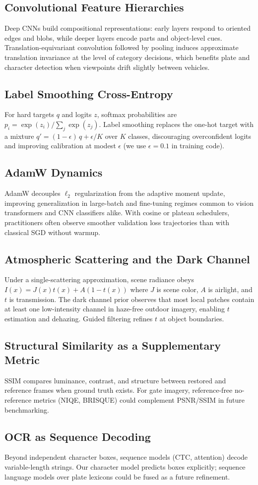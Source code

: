 \subsection{Convolutional Feature Hierarchies}
Deep CNNs build compositional representations: early layers respond to oriented edges and blobs, while deeper layers encode parts and object-level cues. Translation-equivariant convolution followed by pooling induces approximate translation invariance at the level of category decisions, which benefits plate and character detection when viewpoints drift slightly between vehicles.

\subsection{Label Smoothing Cross-Entropy}
For hard targets $q$ and logits $z$, softmax probabilities are $p_i=\exp(z_i)/\sum_j\exp(z_j)$. Label smoothing replaces the one-hot target with a mixture $q'=(1-\epsilon)\,q+\epsilon/K$ over $K$ classes, discouraging overconfident logits and improving calibration at modest $\epsilon$ (we use $\epsilon{=}0.1$ in training code).

\subsection{AdamW Dynamics}
AdamW decouples $\ell_2$ regularization from the adaptive moment update, improving generalization in large-batch and fine-tuning regimes common to vision transformers and CNN classifiers alike. With cosine or plateau schedulers, practitioners often observe smoother validation loss trajectories than with classical SGD without warmup.

\subsection{Atmospheric Scattering and the Dark Channel}
Under a single-scattering approximation, scene radiance obeys $I(x)=J(x)t(x)+A(1-t(x))$ where $J$ is scene color, $A$ is airlight, and $t$ is transmission. The dark channel prior observes that most local patches contain at least one low-intensity channel in haze-free outdoor imagery, enabling $t$ estimation and dehazing. Guided filtering refines $t$ at object boundaries.

\subsection{Structural Similarity as a Supplementary Metric}
SSIM compares luminance, contrast, and structure between restored and reference frames when ground truth exists. For gate imagery, reference-free no-reference metrics (NIQE, BRISQUE) could complement PSNR/SSIM in future benchmarking.

\subsection{OCR as Sequence Decoding}
Beyond independent character boxes, sequence models (CTC, attention) decode variable-length strings. Our character model predicts boxes explicitly; sequence language models over plate lexicons could be fused as a future refinement.

